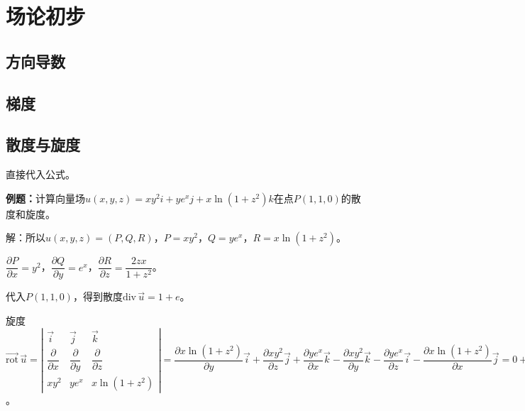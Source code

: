 \section{场论初步}

\subsection{方向导数}

\subsection{梯度}

\subsection{散度与旋度}

直接代入公式。

\textbf{例题：}计算向量场$u(x,y,z)=xy^2i+ye^xj+x\ln(1+z^2)k$在点$P(1,1,0)$的散度和旋度。

解：所以$u(x,y,z)=(P,Q,R)$，$P=xy^2$，$Q=ye^x$，$R=x\ln(1+z^2)$。

$\dfrac{\partial P}{\partial x}=y^2$，$\dfrac{\partial Q}{\partial y}=e^x$，$\dfrac{\partial R}{\partial z}=\dfrac{2zx}{1+z^2}$。

代入$P(1,1,0)$，得到散度$\textrm{div}\,\vec{u}=1+e$。

旋度$\overrightarrow{\textrm{rot}}\,\vec{u}=\left\vert\begin{array}{ccc}
    \vec{i} & \vec{j} & \vec{k} \\
    \dfrac{\partial}{\partial x} & \dfrac{\partial}{\partial y} & \dfrac{\partial}{\partial z} \\
    xy^2 & ye^x & x\ln(1+z^2)
\end{array}\right\vert=\dfrac{\partial x\ln(1+z^2)}{\partial y}\vec{i}+\dfrac{\partial xy^2}{\partial z}\vec{j}+\dfrac{\partial ye^x}{\partial x}\vec{k}-\dfrac{\partial xy^2}{\partial y}\vec{k}-\dfrac{\partial ye^x}{\partial z}\vec{i}-\dfrac{\partial x\ln(1+z^2)}{\partial x}\vec{j}=0+0+ye^x\vec{k}-2xy\vec{k}-0-\ln(1+z^2)\vec{j}=-\ln(1+z^2)\vec{j}+(ye^x-2xy)\vec{k}=(0,0,e-2)$。

%
